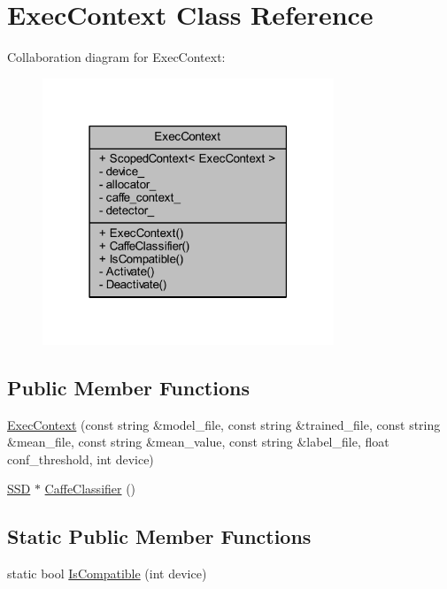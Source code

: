 \hypertarget{class_exec_context}{}\section{Exec\+Context Class Reference}
\label{class_exec_context}


Collaboration diagram for Exec\+Context\+:\nopagebreak
\begin{figure}[H]
\begin{center}
\leavevmode
\includegraphics[width=247pt]{class_exec_context__coll__graph}
\end{center}
\end{figure}
\subsection*{Public Member Functions}
\begin{DoxyCompactItemize}
\item 
\mbox{\hyperlink{class_exec_context_a88e6438e9e4bba24c27aa02ee5d40bd5}{Exec\+Context}} (const string \&model\+\_\+file, const string \&trained\+\_\+file, const string \&mean\+\_\+file, const string \&mean\+\_\+value, const string \&label\+\_\+file, float conf\+\_\+threshold, int device)
\item 
\mbox{\hyperlink{class_s_s_d}{S\+SD}} $\ast$ \mbox{\hyperlink{class_exec_context_a6c596880b2a6a4c8df7e8ca639f2a1b7}{Caffe\+Classifier}} ()
\end{DoxyCompactItemize}
\subsection*{Static Public Member Functions}
\begin{DoxyCompactItemize}
\item 
static bool \mbox{\hyperlink{class_exec_context_ae0873cef48079986d31639654f915bd0}{Is\+Compatible}} (int device)
\end{DoxyCompactItemize}

